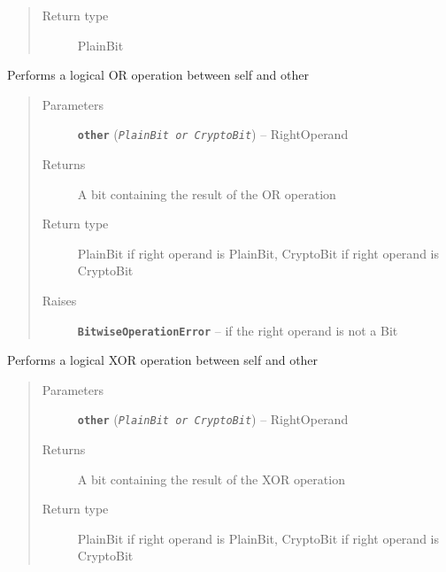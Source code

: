 \documentclass[letterpaper,10pt,english]{sphinxmanual}
\begin{document}
\begin{fulllineitems}
\begin{fulllineitems}
\begin{quote}
\begin{description}
\item[{Return type}] \leavevmode
PlainBit

\end{description}\end{quote}

\end{fulllineitems}


\begin{fulllineitems}
\label{datatypes.bits:datatypes.bits.Bit.PlainBit.OR}
Performs a logical OR operation between self and other
\begin{quote}\begin{description}
\item[{Parameters}] \leavevmode
\textbf{\texttt{other}} (\emph{\texttt{PlainBit or CryptoBit}}) -- RightOperand

\item[{Returns}] \leavevmode
A bit containing the result of the OR operation

\item[{Return type}] \leavevmode
PlainBit if right operand is PlainBit, CryptoBit if right operand is CryptoBit

\item[{Raises}] \leavevmode
\textbf{\texttt{BitwiseOperationError}} -- if the right operand is not a Bit

\end{description}\end{quote}

\end{fulllineitems}


\begin{fulllineitems}
\label{datatypes.bits:datatypes.bits.Bit.PlainBit.XOR}
Performs a logical XOR operation between self and other
\begin{quote}\begin{description}
\item[{Parameters}] \leavevmode
\textbf{\texttt{other}} (\emph{\texttt{PlainBit or CryptoBit}}) -- RightOperand

\item[{Returns}] \leavevmode
A bit containing the result of the XOR operation

\item[{Return type}] \leavevmode
PlainBit if right operand is PlainBit, CryptoBit if right operand is CryptoBit


\end{description}
\end{quote}
\end{fulllineitems}
\end{fulllineitems}
\end{document}
